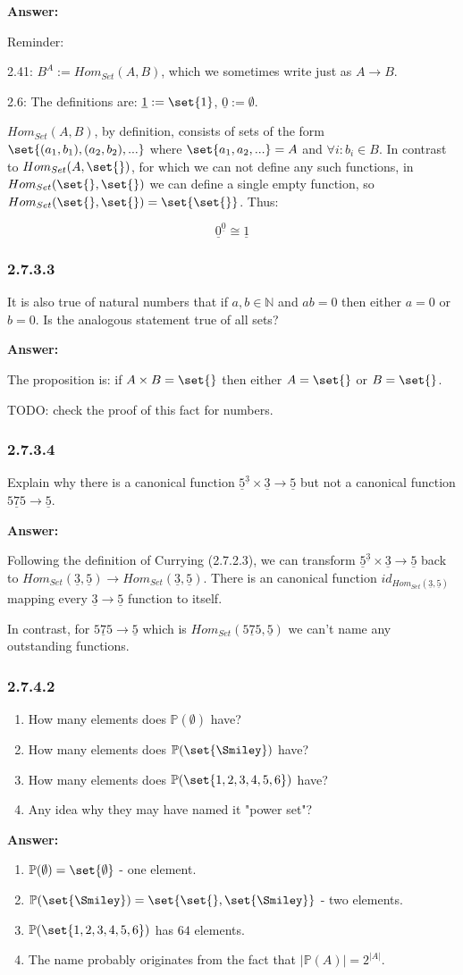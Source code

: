 \documentclass{article}
\newcommand{\N}{\mathbb{N}}
\newcommand{\Pow}{\mathbb{P}}
\newcommand{\vsp}[0]{\vspace*{10pt}\par}
\newcommand{\exercise}[1]{\subsubsection*{#1}}
\newcommand{\ans}[0]{\vsp\textbf{Answer: }\vsp}
\newcommand{\U}[1]{{\underline{#1}}}
\newcommand{\ei}{\item}
\newcommand{\es}{\begin{enumerate}[label=(\alph*)]\ei}
\newcommand{\ee}{\end{enumerate}}
\begin{document}
\ans

Reminder:

2.41: $B^A := Hom_{Set}(A,B)$, which we sometimes write just as $A \to B$.

2.6: The definitions are: $\underline{1} := \set{1}$, $\underline{0} := \emptyset$.

\vsp

$Hom_{Set}(A,B)$, by definition, consists of sets of the form
$\set{(a_1,b_1),(a_2,b_2),...}$ where $\set{a_1, a_2, ...} = A$ and $\forall i:
b_i \in B$.  In contrast to $Hom_{Set}(A,\set{})$, for which we can not define
any such functions, in $Hom_{Set}(\set{}, \set{})$ we can define a single empty
function, so $Hom_{Set}(\set{}, \set{}) = \set{\set{}}$. Thus:

\[
  \underline{0}^{\underline{0}} \cong \underline{1}
\]

\exercise{2.7.3.3}

It is also true of natural numbers that if $a, b \in \N$ and $ab = 0$ then either
$a = 0$ or $b = 0$. Is the analogous statement true of all sets?

\ans

The proposition is: if $A \times B = \set{}$ then either $A = \set{}$ or $B = \set{}$.

TODO: check the proof of this fact for numbers.

\exercise{2.7.3.4}

Explain why there is a canonical function $\U{5}^\U{3} \times \U{3} \to \U{5}$ but not a
canonical function $\U{575} \to \U{5}$.

\ans

Following the definition of Currying (2.7.2.3), we can transform $\U{5}^\U{3}
\times \U{3} \to \U{5}$ back to $Hom_{Set}(\U{3},\U{5}) \to
Hom_{Set}(\U{3},\U{5})$.  There is an canonical function
$id_{Hom_{Set}(\U{3},\U{5})}$ mapping every $\U{3} \to \U{5}$ function to
itself.

In contrast, for $\U{575} \to \U{5}$ which is $Hom_{Set}(\U{575},\U{5})$ we
can't name any outstanding functions.

\exercise{2.7.4.2}

\es How many elements does $\Pow(\emptyset)$ have?
\ei How many elements does $\Pow(\set{\Smiley})$ have?
\ei How many elements does $\Pow(\set{1, 2, 3, 4, 5, 6})$ have?
\ei Any idea why they may have named it "power set"?
\ee

\ans

\es $\Pow(\emptyset) = \set{\emptyset}$ - one element.
\ei $\Pow(\set{\Smiley}) = \set{\set{}, \set{\Smiley}}$ - two elements.
\ei $\Pow(\set{1, 2, 3, 4, 5, 6})$ has $64$ elements.
\ei The name probably originates from the fact that $|\Pow(A)| = 2^{|A|}$.
\ee
\end{document}
